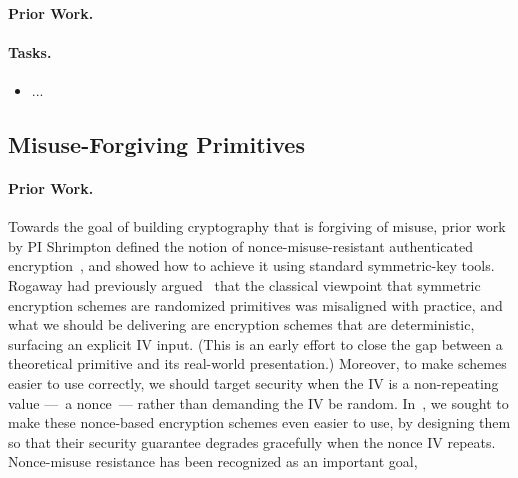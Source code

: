 \paragraph{Prior Work.} 


\paragraph{Tasks.}
\begin{itemize}
\item ...
\end{itemize}


\subsection{Misuse-Forgiving Primitives}

\paragraph{Prior Work.}
Towards the goal of building cryptography that is forgiving of misuse, prior
work by PI Shrimpton defined the notion of nonce-misuse-resistant authenticated
encryption~\cite{RS06}, and showed how to achieve it using standard
symmetric-key tools.  Rogaway had previously argued~\cite{xxx} that the
classical viewpoint that symmetric encryption schemes are randomized primitives
was misaligned with practice, and what we should be delivering are encryption
schemes that are deterministic, surfacing an explicit IV input. (This is an
early effort to close the gap between a theoretical primitive and its real-world
presentation.)  Moreover, to make schemes easier to use correctly, we should
target security when the IV is a non-repeating value ---~a nonce~--- rather than
demanding the IV be random.  In~\cite{RS06}, we sought to make these nonce-based
encryption schemes even easier to use, by designing them so that their security
guarantee degrades gracefully when the nonce IV repeats.  Nonce-misuse
resistance has been recognized as an important goal,  


